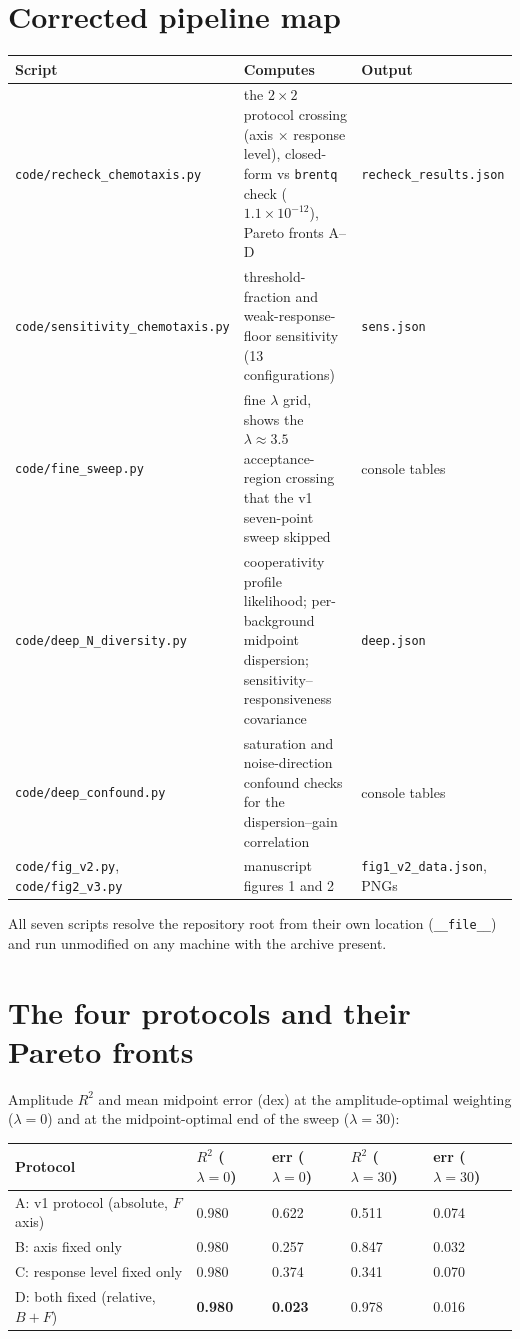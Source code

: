 \documentclass[11pt]{article}
\begin{document}
\section{Corrected pipeline map}

\begin{longtable}{p{5.2cm} p{6.2cm} p{3.6cm}}
\toprule
Script & Computes & Output \\
\midrule
\endhead
\texttt{code/recheck\_chemotaxis.py} & the $2\times2$ protocol crossing (axis $\times$ response
level), closed-form vs \texttt{brentq} check ($1.1\times10^{-12}$), Pareto fronts A--D &
\texttt{recheck\_results.json} \\
\texttt{code/sensitivity\_chemotaxis.py} & threshold-fraction and weak-response-floor sensitivity
(13 configurations) & \texttt{sens.json} \\
\texttt{code/fine\_sweep.py} & fine $\lambda$ grid, shows the $\lambda\approx3.5$ acceptance-region
crossing that the v1 seven-point sweep skipped & console tables \\
\texttt{code/deep\_N\_diversity.py} & cooperativity profile likelihood; per-background midpoint
dispersion; sensitivity--responsiveness covariance & \texttt{deep.json} \\
\texttt{code/deep\_confound.py} & saturation and noise-direction confound checks for the
dispersion--gain correlation & console tables \\
\texttt{code/fig\_v2.py}, \texttt{code/fig2\_v3.py} & manuscript figures 1 and 2 &
\texttt{fig1\_v2\_data.json}, PNGs \\
\bottomrule
\end{longtable}

All seven scripts resolve the repository root from their own location
(\texttt{\_\_file\_\_}) and run unmodified on any machine with the archive present.

\section{The four protocols and their Pareto fronts}

Amplitude $R^2$ and mean midpoint error (dex) at the amplitude-optimal weighting ($\lambda=0$)
and at the midpoint-optimal end of the sweep ($\lambda=30$):

\begin{center}
\begin{tabular}{l l l l l}
\toprule
Protocol & $R^2$ ($\lambda{=}0$) & err ($\lambda{=}0$) & $R^2$ ($\lambda{=}30$) & err ($\lambda{=}30$)\\
\midrule
A: v1 protocol (absolute, $F$ axis) & 0.980 & 0.622 & 0.511 & 0.074 \\
B: axis fixed only              & 0.980 & 0.257 & 0.847 & 0.032 \\
C: response level fixed only    & 0.980 & 0.374 & 0.341 & 0.070 \\
D: both fixed (relative, $B{+}F$) & \textbf{0.980} & \textbf{0.023} & 0.978 & 0.016 \\
\bottomrule
\end{tabular}
\end{center}
\end{document}
